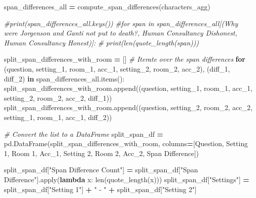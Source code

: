\documentclass[
]{article}
\newenvironment{Shaded}{\begin{snugshade}}{\end{snugshade}}
\newcommand{\BuiltInTok}[1]{#1}
\newcommand{\CommentTok}[1]{\textcolor[rgb]{0.56,0.35,0.01}{\textit{#1}}}
\newcommand{\ControlFlowTok}[1]{\textcolor[rgb]{0.13,0.29,0.53}{\textbf{#1}}}
\newcommand{\KeywordTok}[1]{\textcolor[rgb]{0.13,0.29,0.53}{\textbf{#1}}}
\newcommand{\NormalTok}[1]{#1}
\newcommand{\OperatorTok}[1]{\textcolor[rgb]{0.81,0.36,0.00}{\textbf{#1}}}
\newcommand{\StringTok}[1]{\textcolor[rgb]{0.31,0.60,0.02}{#1}}
\begin{document}
\begin{Shaded}
\begin{Highlighting}[]
\NormalTok{span\_differences\_all }\OperatorTok{=}\NormalTok{ compute\_span\_differences(characters\_agg)}

\CommentTok{\#print(span\_differences\_all.keys())}
\CommentTok{\#for span in span\_differences\_all[(\textquotesingle{}Why were Jorgenson and Ganti not put to death?\textquotesingle{}, \textquotesingle{}Human Consultancy Dishonest\textquotesingle{}, \textquotesingle{}Human Consultancy Honest\textquotesingle{})]:}
\CommentTok{\#  print(len(quote\_length(span)))}
\end{Highlighting}
\end{Shaded}

\begin{Shaded}
\begin{Highlighting}[]
\NormalTok{split\_span\_differences\_with\_room }\OperatorTok{=}\NormalTok{ []}
\CommentTok{\# Iterate over the span differences}
\ControlFlowTok{for}\NormalTok{ (question, setting\_1, room\_1, acc\_1, setting\_2, room\_2, acc\_2), (diff\_1, diff\_2) }\KeywordTok{in}\NormalTok{ span\_differences\_all.items():}
\NormalTok{    split\_span\_differences\_with\_room.append((question, setting\_1, room\_1, acc\_1, setting\_2, room\_2, acc\_2, diff\_1))}
\NormalTok{    split\_span\_differences\_with\_room.append((question, setting\_2, room\_2, acc\_2, setting\_1, room\_1, acc\_1, diff\_2))}
    
\CommentTok{\# Convert the list to a DataFrame}
\NormalTok{split\_span\_df }\OperatorTok{=}\NormalTok{ pd.DataFrame(split\_span\_differences\_with\_room, columns}\OperatorTok{=}\NormalTok{[}\StringTok{\textquotesingle{}Question\textquotesingle{}}\NormalTok{, }\StringTok{\textquotesingle{}Setting 1\textquotesingle{}}\NormalTok{, }\StringTok{\textquotesingle{}Room 1\textquotesingle{}}\NormalTok{, }\StringTok{\textquotesingle{}Acc\_1\textquotesingle{}}\NormalTok{, }\StringTok{\textquotesingle{}Setting 2\textquotesingle{}}\NormalTok{, }\StringTok{\textquotesingle{}Room 2\textquotesingle{}}\NormalTok{, }\StringTok{\textquotesingle{}Acc\_2\textquotesingle{}}\NormalTok{, }\StringTok{\textquotesingle{}Span Difference\textquotesingle{}}\NormalTok{])}

\NormalTok{split\_span\_df[}\StringTok{"Span Difference Count"}\NormalTok{] }\OperatorTok{=}\NormalTok{ split\_span\_df[}\StringTok{"Span Difference"}\NormalTok{].}\BuiltInTok{apply}\NormalTok{(}\KeywordTok{lambda}\NormalTok{ x: }\BuiltInTok{len}\NormalTok{(quote\_length(x)))}
\NormalTok{split\_span\_df[}\StringTok{"Settings"}\NormalTok{] }\OperatorTok{=}\NormalTok{ split\_span\_df[}\StringTok{"Setting 1"}\NormalTok{] }\OperatorTok{+} \StringTok{" {-} "} \OperatorTok{+}\NormalTok{ split\_span\_df[}\StringTok{"Setting 2"}\NormalTok{]}



\end{Highlighting}
\end{Shaded}
\end{document}
